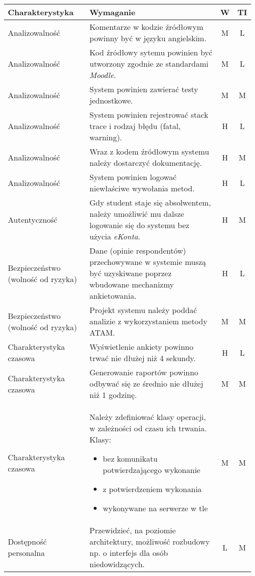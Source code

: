 \newpage
\begin{center}
\begin{longtable}{ | p{4cm} | p{9cm} | c | c | }
\hline
\textbf{Charakterystyka} & \textbf{Wymaganie} & \textbf{W} & \textbf{TI} \\ \hline
%
Analizowalność & Komentarze w kodzie źródłowym powinny być w języku angielskim. & M & L \\ \hline
Analizowalność & Kod źródłowy sytemu powinien być utworzony zgodnie ze standardami \textit{Moodle}. & M & L \\ \hline
Analizowalność & System powinien zawierać testy jednostkowe. & M & M \\ \hline
Analizowalność & System powinien rejestrować stack trace i rodzaj błędu (fatal, warning). & H & L \\ \hline
Analizowalność & Wraz z kodem źródłowym systemu należy dostarczyć dokumentację. & H & M \\ \hline
Analizowalność & System powinien logować niewłaściwe wywołania metod. & H & L \\ \hline
%
Autentyczność & Gdy student staje się absolwentem, należy umożliwić mu dalsze logowanie się do systemu bez użycia \textit{eKonta}. & H & M \\ \hline
%
Bezpieczeństwo (wolność od ryzyka) & Dane (opinie respondentów) przechowywane w systemie muszą być uzyskiwane poprzez wbudowane mechanizmy ankietowania. & H & L \\ \hline
Bezpieczeństwo (wolność od ryzyka) & Projekt systemu należy poddać analizie z wykorzystaniem metody ATAM. & M & M \\ \hline
%
Charakterystyka czasowa & Wyświetlenie ankiety powinno trwać nie dłużej niż 4 sekundy. & H & L \\ \hline
Charakterystyka czasowa & Generowanie raportów powinno odbywać się ze średnio nie dłużej niż 1 godzinę. & M & M \\ \hline
Charakterystyka czasowa & Należy zdefiniować klasy operacji, w zależności od czasu ich trwania. Klasy:
\begin{itemize}
\item{bez komunikatu potwierdzającego wykonanie}
\item{z potwierdzeniem wykonania}
\item{wykonywane na serwerze w tle}
\end{itemize} & M & M \\ \hline
%
Dostępność personalna & Przewidzieć, na poziomie architektury, możliwość rozbudowy np. o interfejs dla osób niedowidzących. & L & M \\ \hline

\end{longtable}
\end{center}
